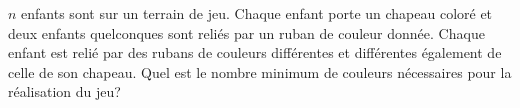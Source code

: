 \documentclass[varwidth]{standalone}
\begin{document}
    $n$ enfants sont sur un terrain de jeu. Chaque enfant porte un chapeau color\'e et deux enfants quelconques sont reli\'es par un ruban de couleur donn\'ee. Chaque enfant est reli\'e par des rubans de couleurs diff\'erentes et diff\'erentes \'egalement de celle de son chapeau. Quel est le nombre minimum de couleurs n\'ecessaires pour la r\'ealisation du jeu?
\end{document}
